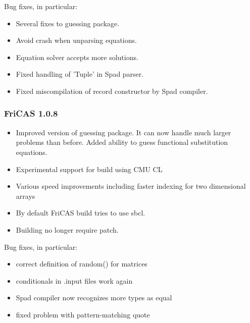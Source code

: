 Bug fixes, in particular:

\begin{itemize}
\item Several fixes to guessing package.

\item Avoid crash when unparsing equations.

\item Equation solver accepts more solutions.

\item Fixed handling of 'Tuple' in Spad parser.

\item Fixed miscompilation of record constructor by Spad compiler.
\end{itemize}

\subsubsection{FriCAS 1.0.8}

\begin{itemize}
\item Improved version of guessing package. It can now handle much
  larger problems than before. Added ability to guess functional
  substitution equations.

\item Experimental support for build using CMU CL

\item Various speed improvements including faster indexing for two
  dimensional arrays

\item By default FriCAS build tries to use sbcl.

\item Building no longer require patch.
\end{itemize}

Bug fixes, in particular:

\begin{itemize}
\item correct definition of random() for matrices

\item conditionals in .input files work again

\item Spad compiler now recognizes more types as equal

\item fixed problem with pattern-matching quote
\end{itemize}

